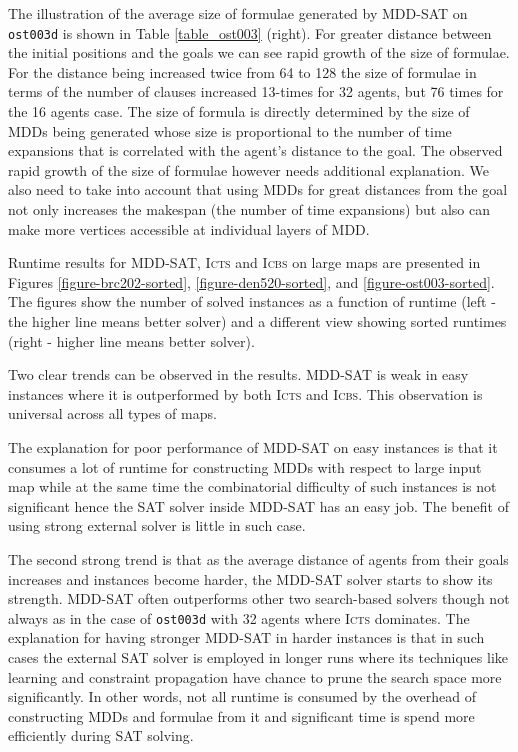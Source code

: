 \documentclass[jair,oneside,11pt]{article}
\begin{document}
The illustration of the average size of formulae generated by MDD-SAT on \texttt{ost003d} is shown in Table \ref{table_ost003} (right). For greater distance between the initial positions and the goals we can see rapid growth of the size of formulae. For the distance being increased twice from 64 to 128 the size of formulae in terms of the number of clauses increased 13-times for 32 agents, but 76 times for the 16 agents case. The size of formula is directly determined by the size of MDDs being generated whose size is proportional to the number of time expansions that is correlated with the agent's distance to the goal. The observed rapid growth of the size of formulae however needs additional explanation. We also need to take into account that using MDDs for great distances from the goal not only increases the makespan (the number of time expansions) but also can make more vertices accessible at individual layers of MDD.

Runtime results for MDD-SAT,  \textsc{Icts} and \textsc{Icbs} on large maps are presented in Figures \ref{figure-brc202-sorted}, \ref{figure-den520-sorted}, and \ref{figure-ost003-sorted}. The figures show the number of solved instances as a function of runtime (left - the higher line means better solver) and a different view showing sorted runtimes (right - higher line means better solver).

Two clear trends can be observed in the results. MDD-SAT is weak in easy instances where it is outperformed by both \textsc{Icts} and \textsc{Icbs}. This observation is universal across all types of maps.

The explanation for poor performance of MDD-SAT on easy instances is that it consumes a lot of runtime for constructing MDDs with respect to large input map while at the same time the combinatorial difficulty of such instances is not significant hence the SAT solver inside MDD-SAT has an easy job. The benefit of using strong external solver is little in such case.

The second strong trend is that as the average distance of agents from their goals increases and instances become harder, the MDD-SAT solver starts to show its strength. MDD-SAT often outperforms other two search-based solvers though not always as in the case of \texttt{ost003d} with 32 agents where \textsc{Icts} dominates. The explanation for having stronger MDD-SAT in harder instances is that in such cases the external SAT solver is employed in longer runs where its techniques like learning and constraint propagation have chance to prune the search space more significantly. In other words, not all runtime is consumed by the overhead of constructing MDDs and formulae from it and significant time is spend more efficiently during SAT solving.
\end{document}
